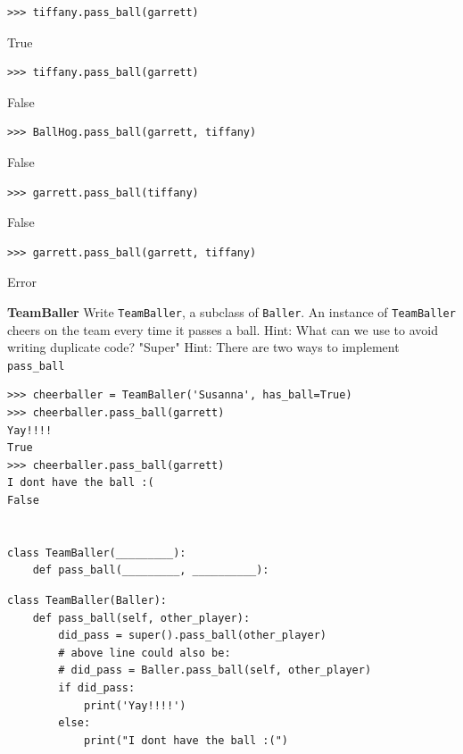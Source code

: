 \documentclass{exam}
\begin{document}
\begin{questions}
\begin{blocksection}
\begin{lstlisting}
>>> tiffany.pass_ball(garrett)
\end{lstlisting}
\begin{solution}[.2in]
True
\end{solution}

\begin{lstlisting}
>>> tiffany.pass_ball(garrett)
\end{lstlisting}
\begin{solution}[.2in]
False
\end{solution}

\begin{lstlisting}
>>> BallHog.pass_ball(garrett, tiffany)
\end{lstlisting}
\begin{solution}[.2in]
False
\end{solution}

\begin{lstlisting}
>>> garrett.pass_ball(tiffany)
\end{lstlisting}
\begin{solution}[.2in]
False
\end{solution}

\begin{lstlisting}
>>> garrett.pass_ball(garrett, tiffany)
\end{lstlisting}
\begin{solution}[.2in]
Error
\end{solution}
\end{blocksection}

\begin{blocksection}
\question \textbf{TeamBaller} \newline
Write \texttt{TeamBaller}, a subclass of \texttt{Baller}. An instance of \texttt{TeamBaller} cheers on the team every time it passes a ball.  \newline
Hint: What can we use to avoid writing duplicate code? \newline
"Super" Hint: There are two ways to implement \texttt{pass\_ball} \newline

\begin{lstlisting}
>>> cheerballer = TeamBaller('Susanna', has_ball=True)
>>> cheerballer.pass_ball(garrett)
Yay!!!!
True
>>> cheerballer.pass_ball(garrett)
I dont have the ball :(
False


class TeamBaller(_________):
	def pass_ball(_________, __________):
\end{lstlisting}
\begin{solution}[1in]
\begin{lstlisting}
class TeamBaller(Baller):
	def pass_ball(self, other_player):
		did_pass = super().pass_ball(other_player) 
		# above line could also be:
		# did_pass = Baller.pass_ball(self, other_player)
		if did_pass:
			print('Yay!!!!')
		else:
			print("I dont have the ball :(")
\end{lstlisting}
\end{solution}
\end{blocksection}


\end{questions}
\end{document}
